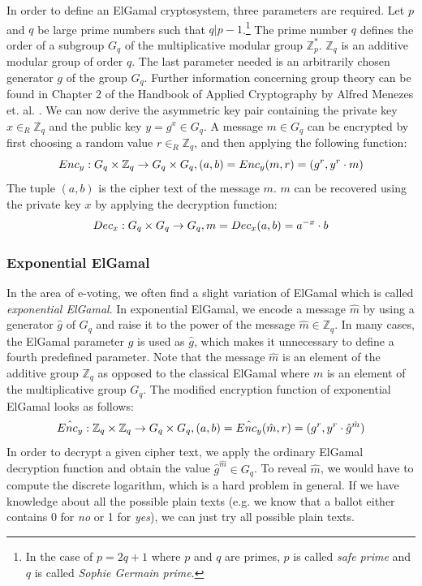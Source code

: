 \documentclass[numbers=noenddot, abstract=on, a4paper, headsepline,
footsepline, oneside, openright, draft=off, listof=leveldown]{scrreprt}
\begin{document}
In order to define an ElGamal cryptosystem, three parameters are required. Let
$p$ and $q$ be large prime numbers such that $q|p-1$.\footnote{In the case of
$p=2q+1$ where $p$ and $q$ are primes, $p$ is called \emph{safe prime} and $q$
is called \emph{Sophie Germain prime}.}
The prime number $q$ defines the order of a subgroup $G_q$ of the multiplicative
modular group $\mathbb{Z}^*_p$. $\mathbb{Z}_q$ is an additive modular group of order $q$. The
last parameter needed is an arbitrarily chosen generator $g$ of the group $G_q$.
Further information concerning group theory can be found in Chapter 2 of the
Handbook of Applied Cryptography by Alfred Menezes et. al. \cite{book:hac}. We
can now derive the asymmetric key pair containing the private key $x \in_R
\mathbb{Z}_q$ and the public key $y=g^x \in G_q$. A message $m \in G_q$ can be
encrypted by first choosing a random value $r \in_R \mathbb{Z}_q$, and then
applying the following function:
\begin{equation}
Enc_y : G_q \times \mathbb{Z}_q \rightarrow G_q \times G_q,
(a, b)=Enc_y(m, r)=(g^r, y^r \cdot m) \notag
\end{equation}
The tuple $(a, b)$ is the cipher text of the message $m$. $m$ can be recovered using the private key $x$
by applying the decryption function:
\begin{equation}
Dec_x : G_q \times G_q \rightarrow G_q,
m=Dec_x(a, b)=a^{-x} \cdot b \notag
\end{equation}

\subsubsection{Exponential ElGamal}
\label{sec:expelgamal}
In the area of e-voting, we often find a slight variation of ElGamal which is
called \emph{exponential ElGamal}. In exponential ElGamal, we encode a message
$\hat{m}$ by using a generator $\hat{g}$ of $G_q$ and raise it to the power of
the message $\hat{m} \in \mathbb{Z}_q$. In many cases, the ElGamal parameter $g$
is used as $\hat{g}$, which makes it unnecessary to define a fourth
predefined parameter. Note that the message $\hat{m}$ is an element of the additive group
$\mathbb{Z}_q$ as opposed to the classical ElGamal where $m$ is an element of
the multiplicative group $G_q$. The modified encryption function of exponential
ElGamal looks as follows:
\begin{equation}
\hat{Enc_y} : \mathbb{Z}_q \times \mathbb{Z}_q \rightarrow G_q \times G_q,
(a, b)=\hat{Enc_y}(\hat{m}, r)=(g^r, y^r \cdot \hat{g}^{\hat{m}}) \notag
\end{equation}
In order to decrypt a given cipher text, we apply the ordinary ElGamal decryption
function and obtain the value $\hat{g}^{\hat{m}} \in G_q$. To reveal $\hat{m}$,
we would have to compute the discrete logarithm, which is a hard problem in
general. If we have knowledge about all the possible plain texts (e.g. we know
that a ballot either contains 0 for \emph{no} or 1 for \emph{yes}), we can just try all
possible plain texts. 
\end{document}
